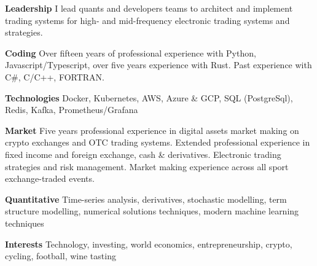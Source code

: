 {\bf Leadership} I lead quants and developers teams to architect and implement trading systems for high- and mid-frequency electronic trading systems and strategies.

{\bf Coding} Over fifteen years of professional experience with Python, Javascript/Typescript, over five years experience with Rust.
Past experience with C\#, C/C++, FORTRAN.

{\bf Technologies} Docker, Kubernetes, AWS, Azure \& GCP, SQL (PostgreSql), Redis, Kafka, Prometheus/Grafana

{\bf Market} Five years professional experience in digital assets market making on crypto exchanges and OTC trading systems.
Extended professional experience in fixed income and foreign exchange, cash \& derivatives.
Electronic trading strategies and risk management.
Market making experience across all sport exchange-traded events.

{\bf Quantitative} Time-series analysis, derivatives, stochastic modelling, term structure modelling, numerical solutions techniques, modern machine learning techniques

{\bf Interests} Technology, investing, world economics, entrepreneurship, crypto, cycling, football, wine tasting
